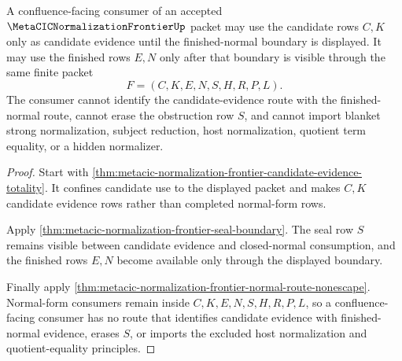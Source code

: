 \begin{theorem}
\label{thm:metacic-normalization-frontier-candidate-confluence-budget}
A confluence-facing consumer of an accepted $\MetaCICNormalizationFrontierUp$ packet may use the candidate rows $C,K$ only as candidate evidence until the finished-normal boundary is displayed. It may use the finished rows $E,N$ only after that boundary is visible through the same finite packet
$$
F=(C,K,E,N,S,H,R,P,L).
$$
The consumer cannot identify the candidate-evidence route with the finished-normal route, cannot erase the obstruction row $S$, and cannot import blanket strong normalization, subject reduction, host normalization, quotient term equality, or a hidden normalizer.
\end{theorem}
\begin{proof}
Start with \autoref{thm:metacic-normalization-frontier-candidate-evidence-totality}. It confines candidate use to the displayed packet and makes $C,K$ candidate evidence rows rather than completed normal-form rows.

Apply \autoref{thm:metacic-normalization-frontier-seal-boundary}. The seal row $S$ remains visible between candidate evidence and closed-normal consumption, and the finished rows $E,N$ become available only through the displayed boundary.

Finally apply \autoref{thm:metacic-normalization-frontier-normal-route-nonescape}. Normal-form consumers remain inside $C,K,E,N,S,H,R,P,L$, so a confluence-facing consumer has no route that identifies candidate evidence with finished-normal evidence, erases $S$, or imports the excluded host normalization and quotient-equality principles.
\end{proof}

